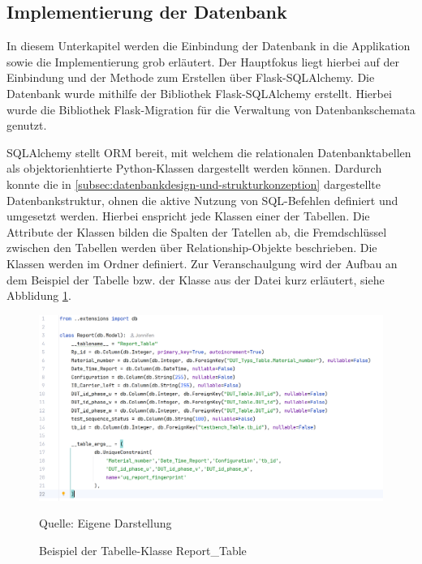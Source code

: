 \subsection{Implementierung der Datenbank}
\label{subsec:implementierung-der-datenbank}

In diesem Unterkapitel werden die Einbindung der Datenbank in die Applikation sowie die Implementierung grob erläutert.
Der Hauptfokus liegt hierbei auf der Einbindung und der Methode zum Erstellen über Flask-SQLAlchemy.
Die Datenbank wurde mithilfe der Bibliothek Flask-SQLAlchemy erstellt.
Hierbei wurde die Bibliothek Flask-Migration für die Verwaltung von Datenbankschemata genutzt.

SQLAlchemy stellt \ac{ORM} bereit, mit welchem die relationalen Datenbanktabellen als objektorienhtierte Python-Klassen
dargestellt werden können.
Dardurch konnte die in \ref{subsec:datenbankdesign-und-strukturkonzeption} dargestellte Datenbankstruktur, ohnen die aktive Nutzung von SQL-Befehlen definiert und umgesetzt werden.
Hierbei enspricht jede Klassen einer der Tabellen.
Die Attribute der Klassen bilden die Spalten der Tatellen ab, die Fremdschlüssel zwischen den Tabellen werden über Relationship-Objekte beschrieben.
Die Klassen werden im Ordner  definiert.
Zur Veranschaulgung wird der Aufbau an dem Beispiel der Tabelle bzw. der Klasse  aus der Datei  kurz erläutert, siehe Abblidung \ref{fig: Beispiel der Tabelle-Klasse Report_Table}.

\begin{figure}[H]
    \centering
    \includegraphics[width=1\textwidth]{Grafiken/5.4 Class.png}
    \caption{Beispiel der Tabelle-Klasse Report_Table}
    \label{fig: Beispiel der Tabelle-Klasse Report_Table}
    {Quelle: Eigene Darstellung}
\end{figure}



